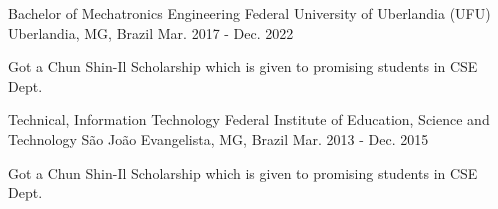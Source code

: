 

\begin{cventries}

    \cventry
      {Bachelor of Mechatronics Engineering} %
      {Federal University of Uberlandia (UFU)} %
      {Uberlandia, MG, Brazil} %
      {Mar. 2017 - Dec. 2022} %
      {
        \begin{cvitems} %
          \item {Got a Chun Shin-Il Scholarship which is given to promising students in CSE Dept.}
        \end{cvitems}
      }
  
  
  \cventry
  {Technical, Information Technology} %
  {Federal Institute of Education, Science and Technology} %
  {São João Evangelista, MG, Brazil} %
  {Mar. 2013 - Dec. 2015} %
  {
    \begin{cvitems} %
      \item {Got a Chun Shin-Il Scholarship which is given to promising students in CSE Dept.}
    \end{cvitems}
  }
  
  \end{cventries}